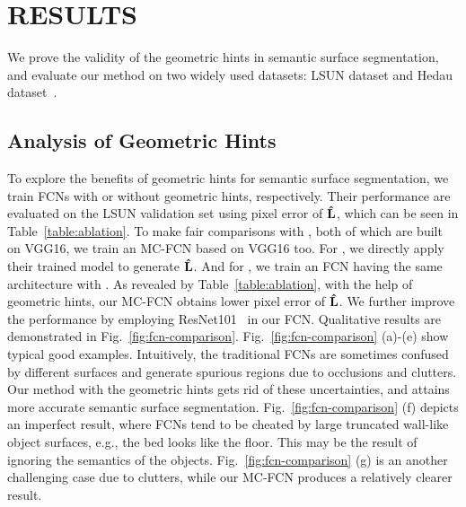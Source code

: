 \section{RESULTS}
\label{sec:Res}

We prove the validity of the geometric hints in semantic surface segmentation, and evaluate our method on two widely used datasets: LSUN dataset \cite{zhang2015large} and Hedau dataset~\cite{hedau2009recovering}. 

\subsection{Analysis of Geometric Hints}
\label{sec:ablation}
To explore the benefits of geometric hints for semantic surface segmentation, we train FCNs with or without geometric hints, respectively. 
Their performance are evaluated on the LSUN validation set using pixel error of $\mathbf{\hat{L}}$, which can be seen in Table~\ref{table:ablation}. To make fair comparisons with \cite{ren2016coarse, dasgupta2016delay}, both of which are built on VGG16, we train an MC-FCN based on VGG16 too. For \cite{ren2016coarse}, we directly apply their trained model to generate $\mathbf{\hat{L}}$. And for \cite{dasgupta2016delay}, we train an FCN having the same architecture with \cite{dasgupta2016delay}. As revealed by Table~\ref{table:ablation}, with the help of geometric hints, our MC-FCN obtains lower pixel error of $\mathbf{\hat{L}}$. We further improve the performance by employing ResNet101~\cite{he2016deep} in our FCN. 
Qualitative results are demonstrated in Fig.~\ref{fig:fcn-comparison}. 
Fig.~\ref{fig:fcn-comparison} (a)-(e) show typical good examples. Intuitively, the traditional FCNs are sometimes confused by different surfaces and generate spurious regions due to occlusions and clutters. 
Our method with the geometric hints gets rid of these uncertainties, and attains more accurate semantic surface segmentation. Fig.~\ref{fig:fcn-comparison} (f) depicts an imperfect result, where FCNs tend to be cheated by large truncated wall-like object surfaces, e.g., the bed looks like the floor. This may be the result of ignoring the semantics of the objects. Fig.~\ref{fig:fcn-comparison} (g) is an another challenging case due to clutters, while our MC-FCN produces a relatively clearer result.  

